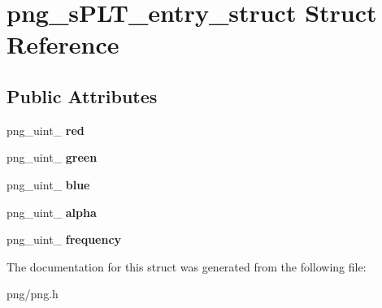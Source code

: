 \hypertarget{structpng__s_p_l_t__entry__struct}{}\section{png\+\_\+s\+P\+L\+T\+\_\+entry\+\_\+struct Struct Reference}
\label{structpng__s_p_l_t__entry__struct}
\subsection*{Public Attributes}
\begin{DoxyCompactItemize}
\item 
png\+\_\+uint\+\_ {\bfseries red}\hypertarget{structpng__s_p_l_t__entry__struct_a05ba3cef8aa2c43d1f52c0300c525fd9}{}\label{structpng__s_p_l_t__entry__struct_a05ba3cef8aa2c43d1f52c0300c525fd9}

\item 
png\+\_\+uint\+\_ {\bfseries green}\hypertarget{structpng__s_p_l_t__entry__struct_a3b4269fb63b4087bd618a6741b805554}{}\label{structpng__s_p_l_t__entry__struct_a3b4269fb63b4087bd618a6741b805554}

\item 
png\+\_\+uint\+\_ {\bfseries blue}\hypertarget{structpng__s_p_l_t__entry__struct_a2af6281d3b400362886a43977ebcb7db}{}\label{structpng__s_p_l_t__entry__struct_a2af6281d3b400362886a43977ebcb7db}

\item 
png\+\_\+uint\+\_ {\bfseries alpha}\hypertarget{structpng__s_p_l_t__entry__struct_abea98962a064e2a05f460b9f2ea2f47b}{}\label{structpng__s_p_l_t__entry__struct_abea98962a064e2a05f460b9f2ea2f47b}

\item 
png\+\_\+uint\+\_ {\bfseries frequency}\hypertarget{structpng__s_p_l_t__entry__struct_ad8095a15bb5a054c12ef911478c5f3a3}{}\label{structpng__s_p_l_t__entry__struct_ad8095a15bb5a054c12ef911478c5f3a3}

\end{DoxyCompactItemize}


The documentation for this struct was generated from the following file\+:\begin{DoxyCompactItemize}
\item 
png/png.\+h\end{DoxyCompactItemize}
